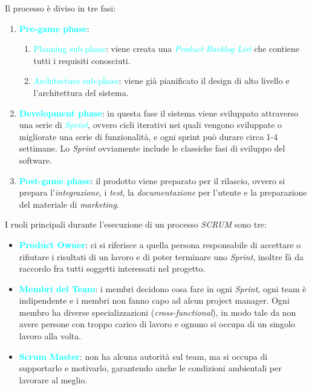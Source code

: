 Il processo è diviso in tre fasi:

\begin{enumerate}
    \item \textbf{\textcolor{cyan}{Pre-game phase}}: 
        \begin{enumerate}
            \item \textcolor{cyan}{Planning sub-phase}: viene creata una \emph{\textcolor{cyan}{Product Backlog List}}
                che contiene tutti i requisiti conosciuti.
            \item \textcolor{cyan}{Architecture sub-phase}: viene già pianificato il design di alto livello e l'architettura del sistema.
        \end{enumerate}
    \item \textbf{\textcolor{cyan}{Development phase}}: in questa fase il sistema viene sviluppato attraverso una serie di \emph{\textcolor{cyan}{Sprint}},
        ovvero cicli iterativi nei quali vengono sviluppate o migliorate una serie di funzionalità, e ogni sprint può durare circa 1-4 settimane. Lo \emph{Sprint} ovviamente
        include le classiche fasi di sviluppo del software.
    \item \textbf{\textcolor{cyan}{Post-game phase}}: il prodotto viene preparato per il rilascio, ovvero si prepara l'\emph{integrazione},
        i \emph{test}, la \emph{documentazione} per l'utente e la preparazione del materiale di \emph{marketing}.
\end{enumerate}

I ruoli principali durante l'esecuzione di un processo \emph{SCRUM} sono tre:

\begin{itemize}
    \item \textbf{\textcolor{cyan}{Product Owner}}: ci si riferisce a quella persona responsabile di accettare o rifiutare i risultati di un lavoro e di poter terminare uno \emph{Sprint}, inoltre
        fà da raccordo fra tutti soggetti interessati nel progetto.
    \item \textbf{\textcolor{cyan}{Membri del Team}}: i membri decidono cosa fare in ogni \emph{Sprint}, ogni team è indipendente e i membri non fanno capo ad alcun project manager.
        Ogni membro ha diverse specializzazioni (\emph{cross-functional}), in modo tale da non avere persone con troppo carico di lavoro e ognuno si occupa di un singolo lavoro alla volta.
    \item \textbf{\textcolor{cyan}{Scrum Master}}: non ha alcuna autorità sul team, ma si occupa di supportarlo e motivarlo, garantendo anche le condizioni ambientali per lavorare al meglio.
\end{itemize}

